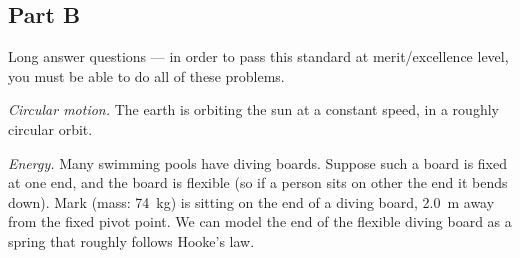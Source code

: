 \documentclass[answers]{exam}
\begin{document}
\subsection*{Part B}
Long answer questions --- in order to pass this standard at merit/excellence level,
you must be able to do all of these problems.
\begin{questions}
  \question \textit{Circular motion.} The earth is orbiting the sun at a constant speed, in a roughly circular orbit.
  \question \textit{Energy.} Many swimming pools have diving boards. Suppose such a board is fixed at one end, and the board
            is flexible (so if a person sits on other the end it bends down). Mark (mass: \SI{74}{\kilo\gram}) is
            sitting on the end of a diving board, \SI{2.0}{\metre} away from the fixed pivot point. We can
            model the end of the flexible diving board as a spring that roughly follows Hooke's law.
\end{questions}
\end{document}
